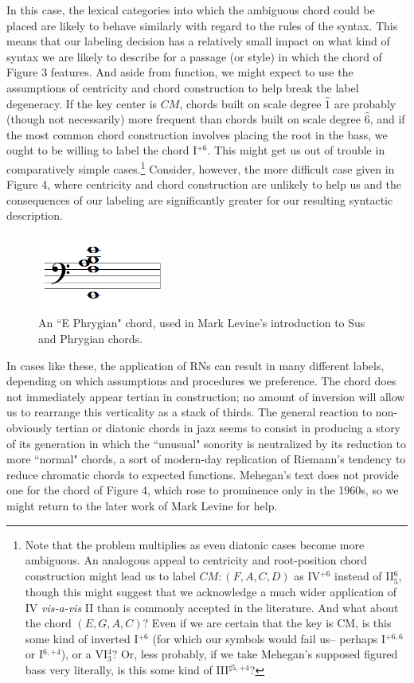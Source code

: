 In this case, the lexical categories into which the ambiguous chord could be placed are likely to behave similarly with regard to the rules of the syntax.  This means that our labeling decision has a relatively small impact on what kind of syntax we are likely to describe for a passage (or style) in which the chord of Figure 3 features.  And aside from function, we might expect to use the assumptions of centricity and chord construction to help break the label degeneracy.  If the key center is $CM$, chords built on scale degree $\hat{1}$ are probably (though not necessarily) more frequent than chords built on scale degree $\hat{6}$, and if the most common chord construction involves placing the root in the bass, we ought to be willing to label the chord I$^{+6}$.  This might get us out of trouble in comparatively simple cases.\footnote{Note that the problem multiplies as even diatonic cases become more ambiguous.  An analogous appeal to centricity and root-position chord construction might lead us to label $CM: (F,A,C,D)$ as IV$^{+6}$ instead of II$^{6}_5$, though this might suggest that we acknowledge a much wider application of IV \emph{vis-a-vis} II than is commonly accepted in the literature. And what about the chord $(E,G,A,C)$?  Even if we are certain that the key is CM, is this some kind of inverted I$^{+6}$ (for which our symbols would fail us-- perhaps I$^{+6,6}$ or I$^{6,+4}$), or a VI$^{4}_3$?  Or, less probably, if we take Mehegan's supposed figured bass very literally, is this some kind of III$^{\sharp 5, +4}$?}  Consider, however, the more difficult case given in Figure 4, where centricity and chord construction are unlikely to help us and the consequences of our labeling are significantly greater for our resulting syntactic description.
\begin{figure}
	\centering
	\caption{An ``E Phrygian" chord, used in Mark Levine's introduction to Sus and Phrygian chords.}
	\includegraphics[width=1.6in]{diss_prospectus_ephryg.png}
\end{figure}

In cases like these, the application of RNs can result in many different labels, depending on which assumptions and procedures we preference.  The chord does not immediately appear tertian in construction; no amount of inversion will allow us to rearrange this verticality as a stack of thirds.  The general reaction to non-obviously tertian or diatonic chords in jazz seems to consist in producing a story of its generation in which the ``unusual" sonority is neutralized by its reduction to more ``normal" chords, a sort of modern-day replication of Riemann's tendency to reduce chromatic chords to expected functions.  Mehegan's text does not provide one for the chord of Figure 4, which rose to prominence only in the 1960s, so we might return to the later work of Mark Levine for help.

